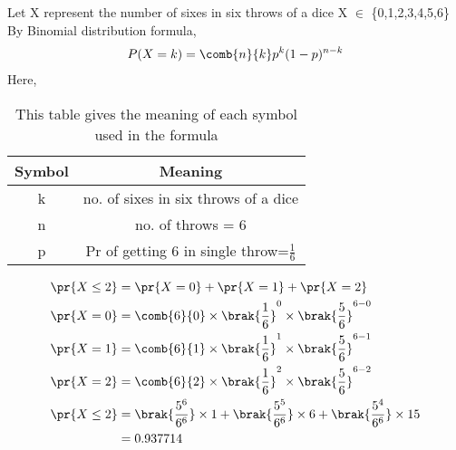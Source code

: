 Let X represent the number of sixes in six throws of a dice
\newline
      X $\in$ \{0,1,2,3,4,5,6\} \\
By Binomial distribution formula, \newline
\begin{align}
P(X=k) = \comb{n}{k}  p^{k} (1-p)^{n-k}
\end{align}
Here,
\begin{table}[!ht]
\centering
\begin{tabular}{|c|c|}
\hline
Symbol & Meaning  \\ \hline
k                      &    no. of sixes in six throws of a dice                 \\ \hline
n                      & no. of throws = 6                    \\ \hline
p                      &  Pr of getting 6 in single throw=\( \frac{1}{6} \)                  \\ \hline
\end{tabular}

\caption{This table gives the meaning of each symbol used in the formula}
\label{tab:Table 5.10}
\end{table}
\begin{align}
\pr{X\leq 2}&=\pr{X=0}+\pr{X=1}+\pr{X=2}\\
 \pr{X=0}&=\comb{6}{0} \times \brak{\frac{1}{6}}^{0} \times  \brak{\frac{5}{6}} ^{6-0}\\
\pr{X=1}&=\comb{6}{1} \times \brak{\frac{1}{6}}^{1} \times  \brak{\frac{5}{6}} ^{6-1}\\
 \pr{X=2}&=\comb{6}{2} \times \brak{\frac{1}{6}}^{2} \times  \brak{\frac{5}{6}} ^{6-2}\\
\pr{X\leq 2} &= \brak{ \frac{5^6}{6^6} } \times 1 + \brak{ \frac{5^5}{6^6} } \times 6 +  \brak{\frac{5^4}{6^6} } \times 15 \\
&= 0.937714 \nonumber\\
\end{align}